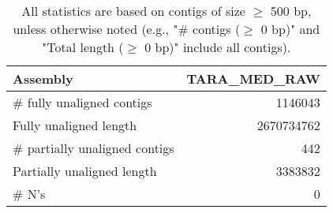 \documentclass[12pt,a4paper]{article}
\begin{document}
\begin{table}[ht]
\begin{center}
\caption{All statistics are based on contigs of size $\geq$ 500 bp, unless otherwise noted (e.g., "\# contigs ($\geq$ 0 bp)" and "Total length ($\geq$ 0 bp)" include all contigs).}
\begin{tabular}{|l*{1}{|r}|}
\hline
Assembly & TARA\_MED\_RAW \\ \hline
\# fully unaligned contigs & 1146043 \\ \hline
Fully unaligned length & 2670734762 \\ \hline
\# partially unaligned contigs & 442 \\ \hline
Partially unaligned length & 3383832 \\ \hline
\# N's & 0 \\ \hline
\end{tabular}
\end{center}
\end{table}
\end{document}
